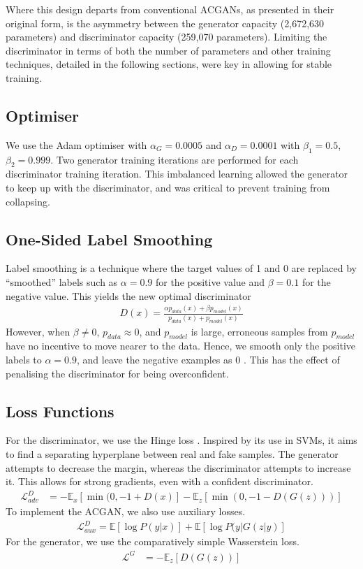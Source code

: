 Where this design departs from conventional ACGANs, as presented in their original form, is the asymmetry between the generator capacity (2,672,630 parameters) and discriminator capacity (259,070 parameters).
Limiting the discriminator in terms of both the number of parameters and other training techniques, detailed in the following sections, were key in allowing for stable training.

\subsection{Optimiser}

We use the Adam optimiser with $\alpha_G = 0.0005$ and $\alpha_D = 0.0001$ with $\beta_1=0.5$, $\beta_2=0.999$.
Two generator training iterations are performed for each discriminator training iteration.
This imbalanced learning allowed the generator to keep up with the discriminator, and was critical to prevent training from collapsing.

\subsection{One-Sided Label Smoothing}

Label smoothing is a technique where the target values of 1 and 0 are replaced by ``smoothed'' labels such as $\alpha=0.9$ for the positive value and $\beta=0.1$ for the negative value.
This yields the new optimal discriminator 
\begin{align}
    D(x) = \frac{\alpha p_{data}(x) + \beta p_{model}(x)}{p_{data}(x) + p_{model}(x)}
\end{align}
However, when $\beta \neq 0$, $p_{data} \approx 0$, and $p_{model}$ is large, erroneous samples from $p_{model}$ have no incentive to move nearer to the data.
Hence, we smooth only the positive labels to $\alpha = 0.9$, and leave the negative examples as 0 \cite{salimans2016}.
This has the effect of penalising the discriminator for being overconfident.

\subsection{Loss Functions} \label{sec:hingeloss}

For the discriminator, we use the Hinge loss \cite{lim2017geometric}.
Inspired by its use in SVMs, it aims to find a separating hyperplane between real and fake samples. 
The generator attempts to decrease the margin, whereas the discriminator attempts to increase it.
This allows for strong gradients, even with a confident discriminator.
\begin{align}
    \mathcal{L}^D_{adv} &= -\mathbb{E}_x [\min(0, -1+D(x)] - \mathbb{E}_z [\min(0, -1-D(G(z)))]
\end{align}
To implement the ACGAN, we also use auxiliary losses.
\begin{align}
    \mathcal{L}^D_{aux} = \mathbb{E}[\log P(y | x)] + \mathbb{E}[\log P(y | G(z|y)]
\end{align}
For the generator, we use the comparatively simple Wasserstein loss.
\begin{align}
    \mathcal{L}^G &= -\mathbb{E}_z[D(G(z))]
\end{align}

